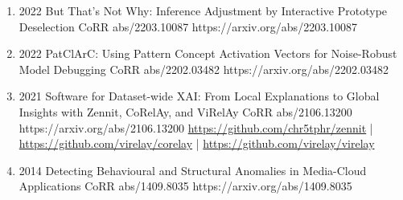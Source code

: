 {\begin{enumerate}
        \item {}
                        {2022}
                        {But That's Not Why: Inference Adjustment by Interactive Prototype Deselection}
                        {CoRR abs/2203.10087}
                        {https://arxiv.org/abs/2203.10087}

        \item {}
                        {2022}
                        {PatClArC: Using Pattern Concept Activation Vectors for Noise-Robust Model Debugging}
                        {CoRR abs/2202.03482}
                        {https://arxiv.org/abs/2202.03482}

        \item {}
                        {2021}
                        {Software for Dataset-wide XAI: From Local Explanations to Global Insights with Zennit, CoRelAy, and ViRelAy}
                        {CoRR abs/2106.13200}
                        {https://arxiv.org/abs/2106.13200}
                        {   \href{https://github.com/chr5tphr/zennit}{https://github.com/chr5tphr/zennit} | \\
                            \href{https://github.com/virelay/corelay}{https://github.com/virelay/corelay} |
                            \href{https://github.com/virelay/virelay}{https://github.com/virelay/virelay}
                        }

        \item {}
                        {2014}
                        {Detecting Behavioural and Structural Anomalies in Media-Cloud Applications}
                        {CoRR abs/1409.8035}
                        {https://arxiv.org/abs/1409.8035}

    \end{enumerate}

}
